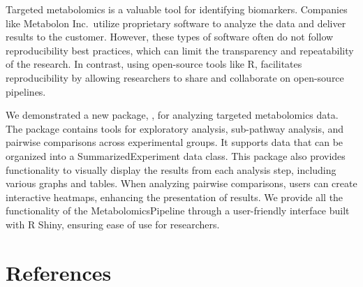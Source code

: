 Targeted metabolomics is a valuable tool for identifying biomarkers. Companies like Metabolon Inc.~utilize proprietary software to analyze the data and deliver results to the customer. However, these types of software often do not follow reproducibility best practices, which can limit the transparency and repeatability of the research. In contrast, using open-source tools like R, facilitates reproducibility by allowing researchers to share and collaborate on open-source pipelines.

We demonstrated a new package, , for analyzing targeted metabolomics data. The package contains tools for exploratory analysis, sub-pathway analysis, and pairwise comparisons across experimental groups. It supports data that can be organized into a SummarizedExperiment data class. This package also provides functionality to visually display the results from each analysis step, including various graphs and tables. When analyzing pairwise comparisons, users can create interactive heatmaps, enhancing the presentation of results. We provide all the functionality of the MetabolomicsPipeline through a user-friendly interface built with R Shiny, ensuring ease of use for researchers.

\section*{References}\label{references}

